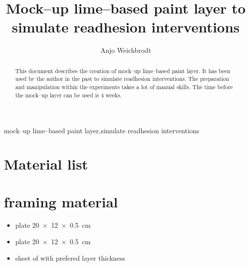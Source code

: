 \documentclass[review]{elsarticle}
\begin{document}
\begin{frontmatter}

\title{Mock--up lime--based paint layer to simulate readhesion interventions}

\author{Anjo Weichbrodt}

\address{Rue Jean Grimoux 8, 1700 Fribourg}

%
%

\begin{abstract}
This document describes the creation of mock--up lime--based paint layer. It has been used by the author in the past to simulate readhesion interventions. The preparation and manipulation within the experiments takes a lot of manual skills. The time before the mock--up layer can be used is 4 weeks.
\end{abstract}

\begin{keyword}
{mock--up lime--based paint layer}\sep{simulate readhesion interventions}
\end{keyword}

\end{frontmatter}

\linenumbers{}


\section{Material list}



\section{framing material}
\begin{itemize}
  \item {} plate \SI[product-units = single]{20 x 12 x 0.5}{\cm}
  \item {} plate \SI[product-units = single]{20 x 12 x 0.5}{\cm}
  \item sheet of  with prefered layer thickness

\end{itemize}
\end{document}
